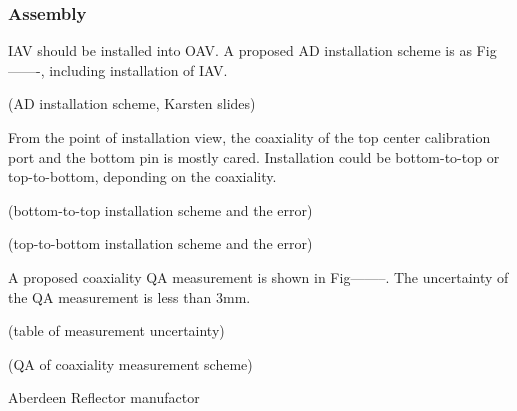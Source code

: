 \subsubsection {Assembly}

IAV should be installed into OAV. A proposed AD installation
scheme is as Fig-------, including installation of IAV.


(AD installation scheme, Karsten slides)


From the point of installation view, the coaxiality of the top center calibration port and
the bottom pin is mostly cared. Installation could be bottom-to-top or top-to-bottom, deponding
on the coaxiality.


(bottom-to-top installation scheme and the error)




(top-to-bottom installation scheme and the error)



A proposed coaxiality QA measurement is shown in Fig--------. The uncertainty
of the QA measurement is less than 3mm.


(table of measurement uncertainty)





(QA of coaxiality measurement scheme)







Aberdeen Reflector manufactor
